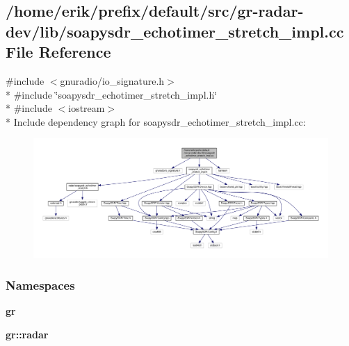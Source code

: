 \subsection{/home/erik/prefix/default/src/gr-\/radar-\/dev/lib/soapysdr\+\_\+echotimer\+\_\+stretch\+\_\+impl.cc File Reference}
\label{soapysdr__echotimer__stretch__impl_8cc}
{\ttfamily \#include $<$gnuradio/io\+\_\+signature.\+h$>$}\\*
{\ttfamily \#include \char`\"{}soapysdr\+\_\+echotimer\+\_\+stretch\+\_\+impl.\+h\char`\"{}}\\*
{\ttfamily \#include $<$iostream$>$}\\*
Include dependency graph for soapysdr\+\_\+echotimer\+\_\+stretch\+\_\+impl.\+cc\+:
\nopagebreak
\begin{figure}[H]
\begin{center}
\leavevmode
\includegraphics[width=350pt]{db/d99/soapysdr__echotimer__stretch__impl_8cc__incl}
\end{center}
\end{figure}
\subsubsection*{Namespaces}
\begin{DoxyCompactItemize}
\item 
 {\bf gr}
\item 
 {\bf gr\+::radar}
\end{DoxyCompactItemize}
